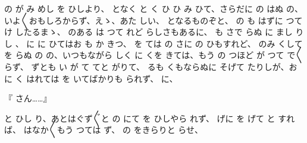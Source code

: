 の
が
み
めし
を
ひしより、
となく
と
く
ひ
ひ
み
ひて、さらだに
の
はぬ
の、いよ〳〵おもしろからず、えゝ、あた
しい、
となるものぞと、
の
も
はずに
つて
け
したるまゝ、
のある
は
つて
れど
らしさもあるに、
も
さで
らぬ
に
まし
りし
、
に
に
ひてはお
も
か
きつ、
を
ては
の
さに
の
ひもすれど、
のみ
くして
を
らぬ
の
の、いつもながら
しく
に
くを
きては、もう
の
つほど
が
つて
で〳〵
らず、
ずとも
い
が
て
てと
がりて、
るも
くもならぬに
そげて
たりしが、お
に
く
はれては
を
いてばかりも
られず、
に、

『
さん……』

と
ひし
り、あとはぐず〴〵と
の
にて
を
ひしやら
れず、
げに
を
げて
と
すれば、
はなか〳〵もう
つては
ず、
の
をきらりと
らせ、

